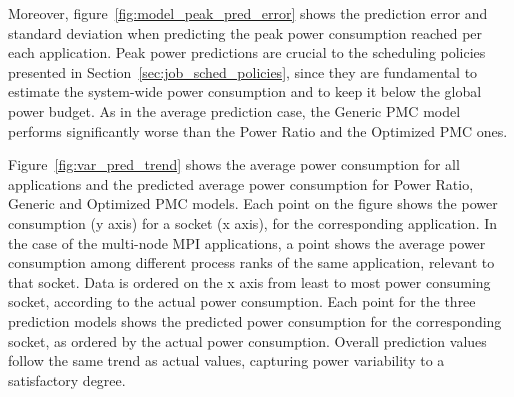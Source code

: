 Moreover, figure~\ref{fig:model_peak_pred_error} shows the prediction error and standard deviation when predicting the
peak power consumption reached per each application. 
Peak power predictions are crucial to the scheduling policies presented in Section~\ref{sec:job_sched_policies}, 
since they are fundamental to estimate the system-wide power consumption
and to keep it below the global power budget.  
As in the average prediction case, the Generic PMC model performs significantly worse than the Power Ratio and the Optimized PMC ones.

Figure~\ref{fig:var_pred_trend} shows the average power consumption for all applications and the predicted average power 
consumption for Power Ratio, Generic and Optimized PMC models. Each point on the figure shows the power consumption (y axis) for a socket (x axis),
for the corresponding application. In the case of the multi-node MPI applications, a point shows the average power consumption among different process ranks of the same
application, relevant to that socket. 
Data is ordered on the x axis from least to most power consuming socket, according to the 
actual power consumption.  
Each point for the three prediction models shows the predicted power consumption for the corresponding socket, as ordered by
the actual power consumption.  
Overall prediction values follow the same trend as actual values, capturing power variability to a satisfactory degree.
\par

